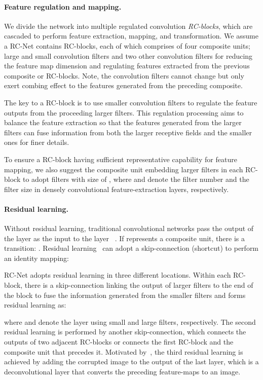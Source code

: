 \documentclass[10pt,twocolumn,letterpaper]{article}
\begin{document}
\paragraph{Feature regulation and mapping.} We divide the network into multiple regulated convolution \textit{RC-blocks}, which are cascaded to perform feature extraction, mapping, and transformation. We assume a RC-Net contains  RC-blocks, each of which comprises of four composite units; large and small convolution filters and two other  convolution filters for reducing the feature map dimension and regulating features extracted from the previous composite or RC-blocks. Note, the  convolution filters cannot change but only exert combing effect to the features generated from the preceding composite.

The key to a RC-block is to use smaller convolution filters to regulate the feature outputs from the proceeding larger filters. This regulation processing aims to balance the feature extraction so that the features generated from the larger filters can fuse information from both the larger receptive fields and the smaller ones for finer details. 

To ensure a RC-block having sufficient representative capability for feature mapping, we also suggest the  composite unit embedding larger filters in each RC-block to adopt  filters with size of , where  and  denote the filter number and the filter size in densely convolutional feature-extraction layers, respectively. 

\paragraph{Residual learning.} Without residual learning, traditional convolutional networks pass the output of the  layer as the input to the  layer ~\cite{krizhevsky2012imagenet}. If  represents a composite unit, there is a transition: . Residual learning~\cite{he2016deep} can adopt a skip-connection (shortcut) to perform an identity mapping: 

RC-Net adopts residual learning in three different locations. Within each RC-block, there is a skip-connection linking the output of larger filters to the end of the block to fuse the information generated from the smaller filters and forms residual learning as: 

where  and  denote the layer using small and large filters, respectively. The second residual learning is performed by another skip-connection, which connects the outputs of two adjacent RC-blocks or connects the first RC-block and the composite unit that precedes it. Motivated by~\cite{kim2016accurate}, the third residual learning is achieved by adding the corrupted image to the output of the last layer, which is a deconvolutional layer that converts the preceding feature-maps to an image. 
\end{document}
